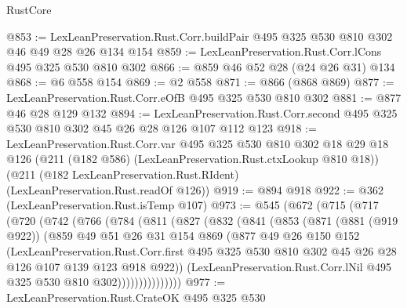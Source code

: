 \begin{lexlean}{RustCore}
\begin{coremodule}
@853 := LexLeanPreservation.Rust.Corr.buildPair @495 @325 @530 @810 @302 @46 @49 @28 @26 @134 @154
@859 := LexLeanPreservation.Rust.Corr.lCons @495 @325 @530 @810 @302
@866 := @859 @46 @52 @28 (@24 @26 @31) @134
@868 := @6 @558 @154
@869 := @2 @558
@871 := @866 (@868 @869)
@877 := LexLeanPreservation.Rust.Corr.eOfB @495 @325 @530 @810 @302
@881 := @877 @46 @28 @129 @132
@894 := LexLeanPreservation.Rust.Corr.second
    @495
    @325
    @530
    @810
    @302
    @45
    @26
    @28
    @126
    @107
    @112
    @123
@918 := LexLeanPreservation.Rust.Corr.var
    @495
    @325
    @530
    @810
    @302
    @18
    @29
    @18
    @126
    (@211 (@182 @586) (LexLeanPreservation.Rust.ctxLookup @810 @18))
    (@211 (@182 LexLeanPreservation.Rust.RIdent) (LexLeanPreservation.Rust.readOf @126))
@919 := @894 @918
@922 := @362 (LexLeanPreservation.Rust.isTemp @107)
@973 := @545
    (@672
      (@715
        (@717
          (@720
            (@742
              (@766
                (@784
                  (@811
                    (@827
                      (@832
                        (@841
                          (@853
                            (@871
                              (@881 (@919 @922))
                              (@859
                                @49
                                @51
                                @26
                                @31
                                @154
                                @869
                                (@877
                                  @49
                                  @26
                                  @150
                                  @152
                                  (LexLeanPreservation.Rust.Corr.first
                                    @495
                                    @325
                                    @530
                                    @810
                                    @302
                                    @45
                                    @26
                                    @28
                                    @126
                                    @107
                                    @139
                                    @123
                                    @918
                                    @922))
                                (LexLeanPreservation.Rust.Corr.lNil
                                  @495
                                  @325
                                  @530
                                  @810
                                  @302)))))))))))))))
@977 := LexLeanPreservation.Rust.CrateOK @495 @325 @530

\end{coremodule}
\end{lexlean}
